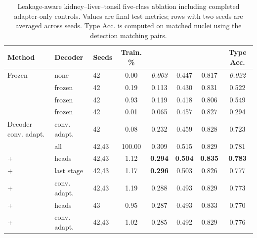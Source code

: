 \begin{table}
\caption{Leakage-aware kidney--liver--tonsil five-class ablation including completed adapter-only controls. Values are final test metrics; rows with two seeds are averaged across seeds. Type Acc. is computed on matched nuclei using the detection matching pairs.}
\label{tab:klt-all}
\centering
\scriptsize
\setlength{\tabcolsep}{2pt}
\begin{tabular}{lllccccc}
\toprule
Method & Decoder & Seeds & Train. \% & \mPQ{} & \bPQ{} & \Fdet{} & Type Acc. \\
\midrule
Frozen \CellViT{} & none & 42 & 0.00 & \emph{0.003} & 0.447 & 0.817 & \emph{0.022} \\
\LoRA{} & frozen & 42 & 0.19 & 0.113 & 0.430 & 0.831 & 0.522 \\
\AF{} & frozen & 42 & 0.93 & 0.119 & 0.418 & 0.806 & 0.549 \\
\VeRA{} & frozen & 42 & 0.01 & 0.065 & 0.457 & 0.827 & 0.294 \\
Decoder conv. adapt. & conv. adapt. & 42 & 0.08 & 0.232 & 0.459 & 0.828 & 0.723 \\
\FullFT{} & all & 42,43 & 100.00 & 0.309 & 0.515 & 0.829 & 0.781 \\
\LoRA{}+\AF{} & heads & 42,43 & 1.12 & \textbf{0.294} & \textbf{0.504} & \textbf{0.835} & \textbf{0.783} \\
\LoRA{}+\AF{} & last stage & 42,43 & 1.17 & \textbf{0.296} & 0.503 & 0.826 & 0.777 \\
\LoRA{}+\AF{} & conv. adapt. & 42,43 & 1.19 & 0.288 & 0.493 & 0.829 & 0.773 \\
\VeRA{}+\AF{} & heads & 43 & 0.95 & 0.287 & 0.493 & 0.833 & 0.770 \\
\VeRA{}+\AF{} & conv. adapt. & 42,43 & 1.02 & 0.285 & 0.492 & 0.829 & 0.776 \\
\bottomrule
\end{tabular}
\end{table}
